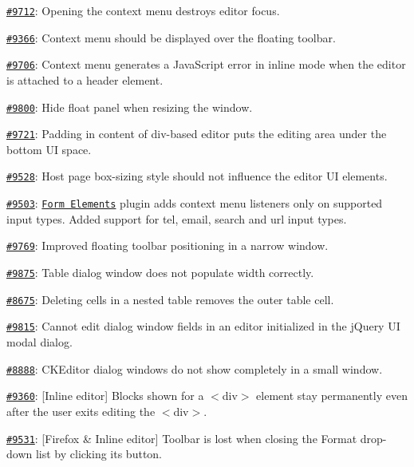{\begin{DoxyItemize}
\begin{DoxyItemize}
\item \href{http://dev.ckeditor.com/ticket/9712}{\tt \#9712}\+: Opening the context menu destroys editor focus.
\item \href{http://dev.ckeditor.com/ticket/9366}{\tt \#9366}\+: Context menu should be displayed over the floating toolbar.
\item \href{http://dev.ckeditor.com/ticket/9706}{\tt \#9706}\+: Context menu generates a Java\+Script error in inline mode when the editor is attached to a header element.
\end{DoxyItemize}
\item \href{http://dev.ckeditor.com/ticket/9800}{\tt \#9800}\+: Hide float panel when resizing the window.
\item \href{http://dev.ckeditor.com/ticket/9721}{\tt \#9721}\+: Padding in content of div-\/based editor puts the editing area under the bottom UI space.
\item \href{http://dev.ckeditor.com/ticket/9528}{\tt \#9528}\+: Host page {\ttfamily box-\/sizing} style should not influence the editor UI elements.
\item \href{http://dev.ckeditor.com/ticket/9503}{\tt \#9503}\+: \href{http://ckeditor.com/addon/forms}{\tt Form Elements} plugin adds context menu listeners only on supported input types. Added support for {\ttfamily tel}, {\ttfamily email}, {\ttfamily search} and {\ttfamily url} input types.
\item \href{http://dev.ckeditor.com/ticket/9769}{\tt \#9769}\+: Improved floating toolbar positioning in a narrow window.
\item \href{http://dev.ckeditor.com/ticket/9875}{\tt \#9875}\+: Table dialog window does not populate width correctly.
\item \href{http://dev.ckeditor.com/ticket/8675}{\tt \#8675}\+: Deleting cells in a nested table removes the outer table cell.
\item \href{http://dev.ckeditor.com/ticket/9815}{\tt \#9815}\+: Cannot edit dialog window fields in an editor initialized in the j\+Query UI modal dialog.
\item \href{http://dev.ckeditor.com/ticket/8888}{\tt \#8888}\+: C\+K\+Editor dialog windows do not show completely in a small window.
\item \href{http://dev.ckeditor.com/ticket/9360}{\tt \#9360}\+: \mbox{[}Inline editor\mbox{]} Blocks shown for a {\ttfamily $<$div$>$} element stay permanently even after the user exits editing the {\ttfamily $<$div$>$}.
\item \href{http://dev.ckeditor.com/ticket/9531}{\tt \#9531}\+: \mbox{[}Firefox \& Inline editor\mbox{]} Toolbar is lost when closing the Format drop-\/down list by clicking its button.

\end{DoxyItemize}}

